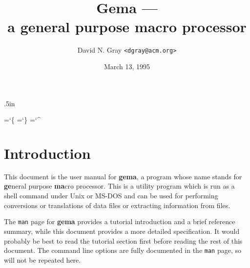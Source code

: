 
\pagestyle{headings}

\oddsidemargin 0.5in \evensidemargin 0.5in
\topmargin 0pt \headsep .5in
\textheight 8.1in \textwidth 6in

\title{\bf Gema --- \\ a general purpose macro processor}
\author{David N. Gray \verb/<dgray@acm.org>/}
\date{March 13, 1995}



\maketitle

\chardef\ttlb=`\{
\chardef\ttrb=`\}
\chardef\ttcaret=`\^

\section{Introduction}

This document is the user manual for {\bf gema}, a program whose name
stands for {\bf ge}neral purpose {\bf ma}cro processor.
This is a utility program which is run as a shell command under Unix or
MS-DOS and can be used for performing conversions or translations
of data files or extracting information from files.

The {\tt man} page for {\bf gema} provides a tutorial introduction and a
brief reference summary, while this document provides a
more detailed specification.
It would probably be best to read the tutorial section first before
reading the rest of this document.  The command line options are fully
documented in the {\tt man} page, so will not be repeated here.









